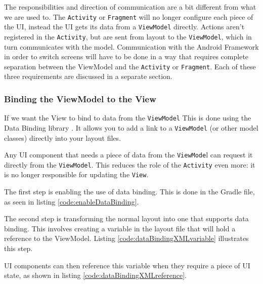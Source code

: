 The responsibilities and direction of communication are a bit different from what we are used to.
The \lstinline!Activity! or \lstinline!Fragment! will no longer configure each piece of the UI, instead the UI gets its data from a \lstinline!ViewModel! directly.
Actions aren't registered in the \lstinline!Activity!, but are sent from layout to the \lstinline!ViewModel!, which in turn communicates with the model.
Communication with the Android Framework in order to switch screens will have to be done in a way that requires complete separation between the ViewModel and the \lstinline!Activity! or \lstinline!Fragment!.
Each of these three requirements are discussed in a separate section.

\subsubsection{Binding the ViewModel to the View}
If we want the View to bind to data from the \lstinline!ViewModel! 
This is done using the Data Binding library \cite{dataBinding}.
It allows you to add a link to a \lstinline!ViewModel! (or other model classes) directly into your layout files.

Any UI component that needs a piece of data from the \lstinline!ViewMode!l can request it directly from the \lstinline!ViewModel!.
This reduces the role of the \lstinline!Activity! even more: it is no longer responsible for updating the \lstinline!View!.

The first step is enabling the use of data binding.
This is done in the Gradle file, as seen in listing \ref{code:enableDataBinding}.



The second step is transforming the normal layout into one that supports data binding.
This involves creating a variable in the layout file that will hold a reference to the ViewModel.
Listing \ref{code:dataBindingXMLvariable} illustrates this step.


UI components can then reference this variable when they require a piece of UI state, as shown in listing \ref{code:dataBindingXMLreference}.

